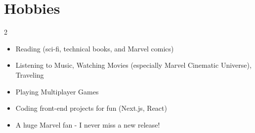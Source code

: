\documentclass[a4paper,11pt]{article}
\newcommand{\resumeItem}[1]{
\item{\small{#1}}
}
\newcommand{\resumeItemListStart}{\begin{itemize}[rightmargin=0.11in]}
\newcommand{\resumeItemListEnd}{\end{itemize}}
\begin{document}
\section{Hobbies}
\vspace{-1.4em}
\begin{multicols}{2}
	\resumeItemListStart{}
	\resumeItem{Reading (sci-fi, technical books, and Marvel comics)}
	\resumeItem{Listening to Music, Watching Movies (especially Marvel Cinematic Universe), Traveling}
	\resumeItem{Playing Multiplayer Games}
	\resumeItem{Coding front-end projects for fun (Next.js, React)}
	\resumeItem{A huge Marvel fan - I never miss a new release!}
	\resumeItemListEnd{}
\end{multicols}
\end{document}
